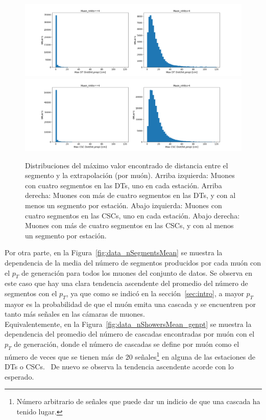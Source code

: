 \begin{figure}[h]
\centering
\includegraphics[width=1.1\textwidth]{figures/data_simple_DT_dist.png}
\includegraphics[width=1.1\textwidth]{figures/data_simple_CSC_dist.png}
\caption{Distribuciones del m\'aximo valor encontrado de distancia entre el segmento y la extrapolaci\'on (por mu\'on). Arriba izquierda: Muones con cuatro segmentos en las DTs, uno en cada estaci\'on. Arriba derecha: Muones con m\'as de cuatro segmentos en las DTs, y con al menos un segmento por estaci\'on. Abajo izquierda: Muones con cuatro segmentos en las CSCs, uno en cada estaci\'on. Abajo derecha: Muones con m\'as de cuatro segmentos en las CSCs, y con al menos un segmento por estaci\'on.}
\label{fig:data_dist}        
\end{figure}


Por otra parte, en la Figura~\ref{fig:data_nSegmentsMean} se muestra la dependencia de la media del n\'umero de segmentos producidos por cada mu\'on con el $p_{T}$ de generaci\'on para todos los muones del conjunto de datos. Se observa en este caso que hay una clara tendencia ascendente del promedio del n\'umero de segmentos con el $p_{T}$, ya que como se indic\'o en la secci\'on~\ref{sec:intro}, a mayor $p_{T}$ mayor es la probabilidad de que el mu\'on emita una cascada y se encuentren por tanto m\'as se\~nales en las c\'amaras de muones.\\

Equivalentemente, en la Figura~\ref{fig:data_nShowersMean_genpt} se muestra la dependencia del promedio del n\'umero de cascadas encontradas por mu\'on con el $p_{T}$ de generaci\'on, donde el n\'umero de cascadas se define por mu\'on como el n\'umero de veces que se tienen m\'as de 20 se\~nales\footnote{N\'umero arbitrario de se\~nales que puede dar un indicio de que una cascada ha tenido lugar.} en alguna de las estaciones de DTs o CSCs. \
De nuevo se observa la tendencia ascendente acorde con lo esperado. \\



